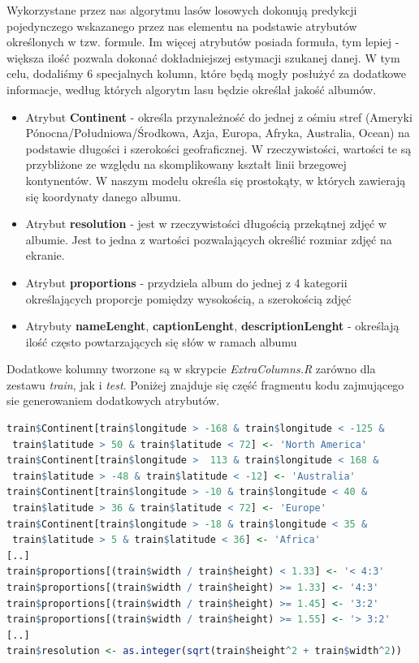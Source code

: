\documentclass[a4paper,twoside]{article}
\begin{document}
Wykorzystane przez nas algorytmu lasów losowych dokonują predykcji pojedynczego wskazanego przez nas elementu na podstawie atrybutów określonych w tzw. formule. Im więcej atrybutów posiada formuła, tym lepiej - większa ilość pozwala dokonać dokładniejszej estymacji szukanej danej.
W tym celu, dodaliśmy 6 specjalnych kolumn, które będą mogły posłużyć za dodatkowe informacje, według których algorytm lasu będzie określał jakość albumów.

\newpage

\begin{itemize}
	\item Atrybut \textbf{Continent} - określa przynależność do jednej z ośmiu stref (Ameryki Pónocna/Południowa/Środkowa, Azja, Europa, Afryka, Australia, Ocean) na podstawie długości i szerokości geofraficznej. W rzeczywistości, wartości te są przybliżone ze względu na skomplikowany kształt linii brzegowej kontynentów. W naszym modelu określa się prostokąty, w których zawierają się koordynaty danego albumu.
	\item Atrybut \textbf{resolution} - jest w rzeczywistości długością przekątnej zdjęć w albumie. Jest to jedna z wartości pozwalających określić rozmiar zdjęć na ekranie.
	\item Atrybut \textbf{proportions} - przydziela album do jednej z 4 kategorii określających proporcje pomiędzy wysokością, a szerokością zdjęć
	\item Atrybuty \textbf{nameLenght}, \textbf{captionLenght}, \textbf{descriptionLenght} - określają ilość często powtarzających się słów w ramach albumu
\end{itemize}

Dodatkowe kolumny tworzone są w skrypcie \textit{ExtraColumns.R} zarówno dla zestawu \textit{train}, jak i \textit{test}. Poniżej znajduje się część fragmentu kodu zajmującego sie generowaniem dodatkowych atrybutów.

\begin{lstlisting}[language=R]
train$Continent[train$longitude > -168 & train$longitude < -125 &
 train$latitude > 50 & train$latitude < 72] <- 'North America'
train$Continent[train$longitude >  113 & train$longitude < 168 &
 train$latitude > -48 & train$latitude < -12] <- 'Australia'
train$Continent[train$longitude > -10 & train$longitude < 40 &
 train$latitude > 36 & train$latitude < 72] <- 'Europe'
train$Continent[train$longitude > -18 & train$longitude < 35 &
 train$latitude > 5 & train$latitude < 36] <- 'Africa'
[..]
train$proportions[(train$width / train$height) < 1.33] <- '< 4:3'
train$proportions[(train$width / train$height) >= 1.33] <- '4:3'
train$proportions[(train$width / train$height) >= 1.45] <- '3:2'
train$proportions[(train$width / train$height) >= 1.55] <- '> 3:2'
[..]
train$resolution <- as.integer(sqrt(train$height^2 + train$width^2))
\end{lstlisting} 
\end{document}
